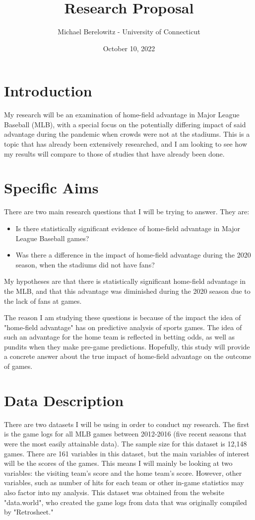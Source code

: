 \documentclass[12pt]{article}
\title{Research Proposal}
\author{Michael Berelowitz - University of Connecticut}
\date{October 10, 2022}
\begin{document}
\maketitle

\section{Introduction}
My research will be an examination of home-field advantage in Major League Baseball (MLB), with a special focus on the potentially differing impact of said advantage during the pandemic when crowds were not at the stadiums. This is a topic that has already been extensively researched, and I am looking to see how my results will compare to those of studies that have already been done.

\section{Specific Aims}
There are two main research questions that I will be trying to answer. They are:
\begin{itemize}
\item Is there statistically significant evidence of home-field advantage in Major League Baseball games?
\item Was there a difference in the impact of home-field advantage during the 2020 season, when the stadiums did not have fans?
\end{itemize}

My hypotheses are that there is statistically significant home-field advantage in the MLB, and that this advantage was diminished during the 2020 season due to the lack of fans at games.

The reason I am studying these questions is because of the impact the idea of "home-field advantage" has on predictive analysis of sports games. The idea of such an advantage for the home team is reflected in betting odds, as well as pundits when they make pre-game predictions. Hopefully, this study will provide a concrete answer about the true impact of home-field advantage on the outcome of games.

\section{Data Description}
There are two datasets I will be using in order to conduct my research. The first is the game logs for all MLB games between 2012-2016 (five recent seasons that were the most easily attainable data). The sample size for this dataset is 12,148 games. There are 161 variables in this dataset, but the main variables of interest will be the scores of the games. This means I will mainly be looking at two variables: the visiting team's score and the home team's score. However, other variables, such as number of hits for each team or other in-game statistics may also factor into my analysis. This dataset was obtained from the website "data.world", who created the game logs from data that was originally compiled by "Retrosheet."
\end{document}

